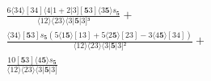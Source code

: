 \documentclass[varwidth, border=5pt]{standalone}
\begin{document}
\begin{my}
$\begin{gathered}
\scriptscriptstyle\frac{6⟨34⟩[34]⟨4|1+2|3][𝟓3]⟨3𝟓⟩s_{𝟓}}{⟨12⟩⟨23⟩⟨3|𝟓|3]³} +\\
\scriptscriptstyle\frac{⟨34⟩[𝟓3]s_{𝟓}(5⟨1𝟓⟩[13]+5⟨2𝟓⟩[23]-3⟨4𝟓⟩[34])}{⟨12⟩⟨23⟩⟨3|𝟓|3]²} +\\
\scriptscriptstyle\frac{10[𝟓3]⟨4𝟓⟩s_{𝟓}}{⟨12⟩⟨23⟩⟨3|𝟓|3]} \phantom{+}
\end{gathered}$
\end{my}
\end{document}
